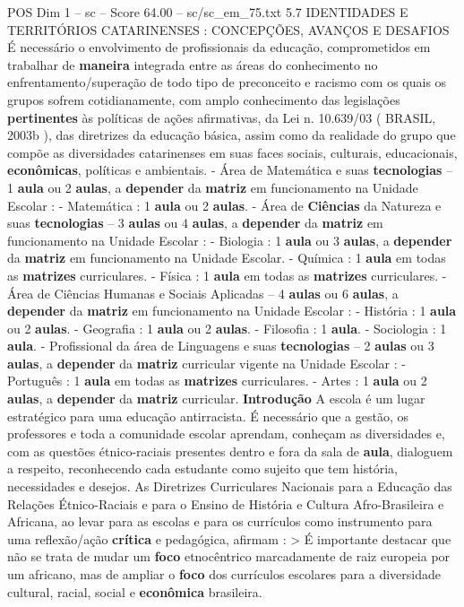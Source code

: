 \begin{textsample}{POS Dim 1 – sc – Score 64.00 – sc/sc\_em\_75.txt}  \label{ex:f1_pos_013}
5.7 IDENTIDADES E TERRITÓRIOS CATARINENSES : CONCEPÇÕES, AVANÇOS E DESAFIOS É necessário o envolvimento de profissionais da educação, comprometidos em trabalhar de \textbf{maneira} integrada entre as áreas do conhecimento no enfrentamento/superação de todo tipo de preconceito e racismo com os quais os grupos sofrem cotidianamente, com amplo conhecimento das legislações \textbf{pertinentes} às políticas de ações afirmativas, da Lei n. 10.639/03 ( BRASIL, 2003b ), das diretrizes da educação básica, assim como da realidade do grupo que compõe as diversidades catarinenses em suas faces sociais, culturais, educacionais, \textbf{econômicas}, políticas e ambientais. - Área de Matemática e suas \textbf{tecnologias} – 1 \textbf{aula} ou 2 \textbf{aulas}, a \textbf{depender} da \textbf{matriz} em funcionamento na Unidade Escolar : - Matemática : 1 \textbf{aula} ou 2 \textbf{aulas}. - Área de \textbf{Ciências} da Natureza e suas \textbf{tecnologias} – 3 \textbf{aulas} ou 4 \textbf{aulas}, a \textbf{depender} da \textbf{matriz} em funcionamento na Unidade Escolar : - Biologia : 1 \textbf{aula} ou 3 \textbf{aulas}, a \textbf{depender} da \textbf{matriz} em funcionamento na Unidade Escolar. - Química : 1 \textbf{aula} em todas as \textbf{matrizes} curriculares. - Física : 1 \textbf{aula} em todas as \textbf{matrizes} curriculares. - Área de Ciências Humanas e Sociais Aplicadas – 4 \textbf{aulas} ou 6 \textbf{aulas}, a \textbf{depender} da \textbf{matriz} em funcionamento na Unidade Escolar : - História : 1 \textbf{aula} ou 2 \textbf{aulas}. - Geografia : 1 \textbf{aula} ou 2 \textbf{aulas}. - Filosofia : 1 \textbf{aula}. - Sociologia : 1 \textbf{aula}. - Profissional da área de Linguagens e suas \textbf{tecnologias} – 2 \textbf{aulas} ou 3 \textbf{aulas}, a \textbf{depender} da \textbf{matriz} curricular vigente na Unidade Escolar : - Português : 1 \textbf{aula} em todas as \textbf{matrizes} curriculares. - Artes : 1 \textbf{aula} ou 2 \textbf{aulas}, a \textbf{depender} da \textbf{matriz} curricular. \textbf{Introdução} A escola é um lugar estratégico para uma educação antirracista.
É necessário que a gestão, os professores e toda a comunidade escolar aprendam, conheçam as diversidades e, com as questões étnico-raciais presentes dentro e fora da sala de \textbf{aula}, dialoguem a respeito, reconhecendo cada estudante como sujeito que tem história, necessidades e desejos.
As Diretrizes Curriculares Nacionais para a Educação das Relações Étnico-Raciais e para o Ensino de História e Cultura Afro-Brasileira e Africana, ao levar para as escolas e para os currículos como instrumento para uma reflexão/ação \textbf{crítica} e pedagógica, afirmam : > É importante destacar que não se trata de mudar um \textbf{foco} etnocêntrico marcadamente de raiz europeia por um africano, mas de ampliar o \textbf{foco} dos currículos escolares para a diversidade cultural, racial, social e \textbf{econômica} brasileira.

\end{textsample}
